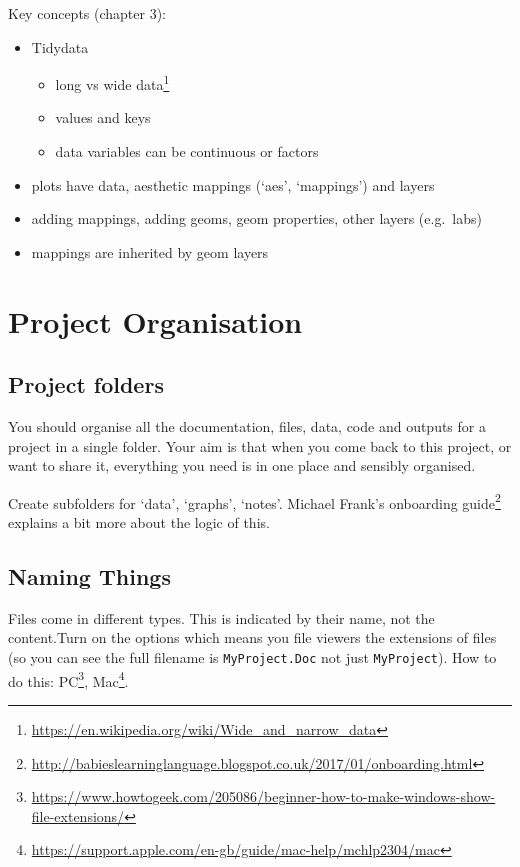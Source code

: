 \documentclass[
  12pt,
  a5paper,
]{book}
\DeclareRobustCommand{\href}[2]{#2\footnote{\url{#1}}}
\providecommand{\tightlist}{%
  \setlength{\itemsep}{0pt}\setlength{\parskip}{0pt}}
\begin{document}
Key concepts (chapter 3):

\begin{itemize}
\tightlist
\item
  Tidydata

  \begin{itemize}
  \tightlist
  \item
    \href{https://en.wikipedia.org/wiki/Wide_and_narrow_data}{long vs wide data}
  \item
    values and keys
  \item
    data variables can be continuous or factors
  \end{itemize}
\item
  plots have data, aesthetic mappings (`aes', `mappings') and layers
\item
  adding mappings, adding geoms, geom properties, other layers (e.g.~labs)
\item
  mappings are inherited by geom layers
\end{itemize}

\hypertarget{project-organisation}{%
\chapter{Project Organisation}\label{project-organisation}}

\hypertarget{project-folders}{%
\section{Project folders}\label{project-folders}}

You should organise all the documentation, files, data, code and outputs for a project in a single folder. Your aim is that when you come back to this project, or want to share it, everything you need is in one place and sensibly organised.

Create subfolders for `data', `graphs', `notes'. \href{http://babieslearninglanguage.blogspot.co.uk/2017/01/onboarding.html}{Michael Frank's onboarding guide} explains a bit more about the logic of this.

\hypertarget{naming-things}{%
\section{Naming Things}\label{naming-things}}

Files come in different types. This is indicated by their name, not the content.Turn on the options which means you file viewers the extensions of files (so you can see the full filename is \texttt{MyProject.Doc} not just \texttt{MyProject}). How to do this: \href{https://www.howtogeek.com/205086/beginner-how-to-make-windows-show-file-extensions/}{PC}, \href{https://support.apple.com/en-gb/guide/mac-help/mchlp2304/mac}{Mac}.
\end{document}
